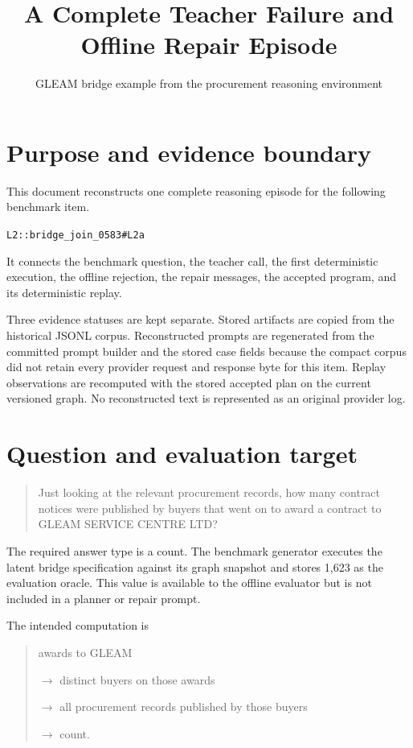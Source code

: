\documentclass[10pt]{article}
\title{A Complete Teacher Failure and Offline Repair Episode}
\author{GLEAM bridge example from the procurement reasoning environment}
\date{}
\begin{document}
\maketitle

\section{Purpose and evidence boundary}

This document reconstructs one complete reasoning episode for the following benchmark item.
\begin{center}
\texttt{L2::bridge\_join\_0583\#L2a}
\end{center}
It connects the benchmark question, the teacher call, the first deterministic execution, the
offline rejection, the repair messages, the accepted program, and its deterministic replay.

Three evidence statuses are kept separate.  Stored artifacts are copied from the historical JSONL
corpus.  Reconstructed prompts are regenerated from the committed prompt builder and the stored
case fields because the compact corpus did not retain every provider request and response byte for
this item.  Replay observations are recomputed with the stored accepted plan on the current
versioned graph.  No reconstructed text is represented as an original provider log.

\section{Question and evaluation target}

\begin{quote}
Just looking at the relevant procurement records, how many contract notices were published by
buyers that went on to award a contract to GLEAM SERVICE CENTRE LTD?
\end{quote}

The required answer type is a count.  The benchmark generator executes the latent bridge
specification against its graph snapshot and stores 1,623 as the evaluation oracle.  This value is
available to the offline evaluator but is not included in a planner or repair prompt.

The intended computation is
\begin{quote}\ttfamily
awards to GLEAM\par
$\rightarrow$ distinct buyers on those awards\par
$\rightarrow$ all procurement records published by those buyers\par
$\rightarrow$ count.
\end{quote}
\end{document}
